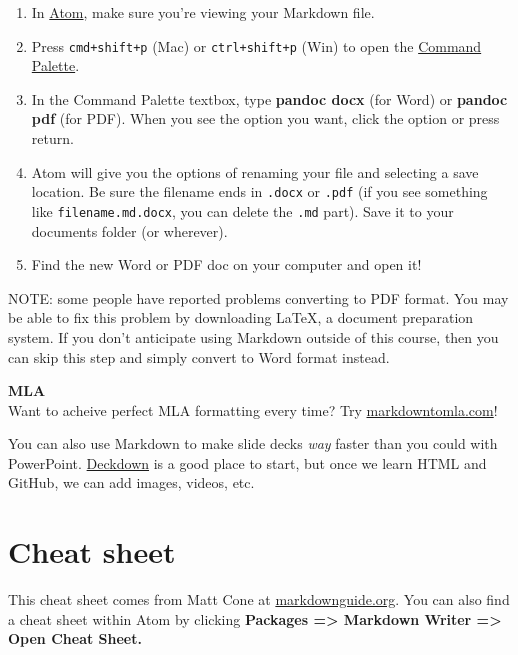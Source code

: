 \documentclass[]{book}
\providecommand{\tightlist}{%
  \setlength{\itemsep}{0pt}\setlength{\parskip}{0pt}}
\theoremstyle{definition}
\theoremstyle{definition}
\theoremstyle{definition}
\theoremstyle{remark}
\begin{document}
\begin{enumerate}
\def\labelenumi{\arabic{enumi}.}
\tightlist
\item
  In \href{https://andylaut.github.io/3844-guidebook/atom.htm}{Atom},
  make sure you're viewing your Markdown file.
\item
  Press \texttt{cmd+shift+p} (Mac) or \texttt{ctrl+shift+p} (Win) to
  open the
  \href{https://andylaut.github.io/3844-guidebook/atom.html\#command-palette}{Command
  Palette}.
\item
  In the Command Palette textbox, type \textbf{pandoc docx} (for Word)
  or \textbf{pandoc pdf} (for PDF). When you see the option you want,
  click the option or press return.
\item
  Atom will give you the options of renaming your file and selecting a
  save location. Be sure the filename ends in \texttt{.docx} or
  \texttt{.pdf} (if you see something like \texttt{filename.md.docx},
  you can delete the \texttt{.md} part). Save it to your documents
  folder (or wherever).
\item
  Find the new Word or PDF doc on your computer and open it!
\end{enumerate}

NOTE: some people have reported problems converting to PDF format. You
may be able to fix this problem by downloading LaTeX, a document
preparation system. If you don't anticipate using Markdown outside of
this course, then you can skip this step and simply convert to Word
format instead.

\textbf{MLA}\\
Want to acheive perfect MLA formatting every time? Try
\href{http://markdowntomla.com/}{markdowntomla.com}!

You can also use Markdown to make slide decks \emph{way} faster than you
could with PowerPoint. \href{http://deckdown.org/}{Deckdown} is a good
place to start, but once we learn HTML and GitHub, we can add images,
videos, etc.

\hypertarget{cheat-sheet}{%
\section{Cheat sheet}\label{cheat-sheet}}

This cheat sheet comes from Matt Cone at
\href{https://www.markdownguide.org/cheat-sheet/}{markdownguide.org}.
You can also find a cheat sheet within Atom by clicking \textbf{Packages
=\textgreater{} Markdown Writer =\textgreater{} Open Cheat Sheet.}
\end{document}
